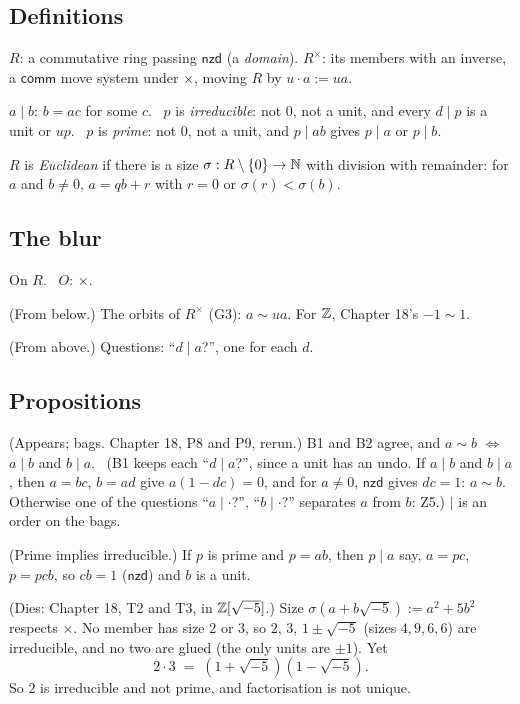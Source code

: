 \subsection*{Definitions}

\begin{lines}
\item[\lab{D1}] $R$: a commutative ring passing $\mathsf{nzd}$ (a \emph{domain}). $R^\times$: its members with an inverse, a $\mathsf{comm}$ move system under $\times$, moving $R$ by $u \cdot a := ua$.
\item[\lab{D2}] $a \mid b$: $b = ac$ for some $c$. \ $p$ is \emph{irreducible}: not $0$, not a unit, and every $d \mid p$ is a unit or $up$. \ $p$ is \emph{prime}: not $0$, not a unit, and $p \mid ab$ gives $p \mid a$ or $p \mid b$.
\item[\lab{D3}] $R$ is \emph{Euclidean} if there is a size $\sigma : R \setminus \{0\} \to \mathbb{N}$ with division with remainder: for $a$ and $b \ne 0$, $a = qb + r$ with $r = 0$ or $\sigma(r) < \sigma(b)$.
\end{lines}

\subsection*{The blur}

On $R$. \ $O$: $\times$.

\begin{lines}
\item[\lab{B1}] (From below.) The orbits of $R^\times$ (G3): $a \sim ua$. For $\mathbb{Z}$, Chapter 18's $-1 \sim 1$.
\item[\lab{B2}] (From above.) Questions: ``$d \mid a$?'', one for each $d$.
\end{lines}

\subsection*{Propositions}

\begin{lines}
\item[\lab{P1}] (Appears; bags. Chapter 18, P8 and P9, rerun.) B1 and B2 agree, and $a \sim b$ $\iff$ $a \mid b$ and $b \mid a$. \ (B1 keeps each ``$d \mid a$?'', since a unit has an undo. If $a \mid b$ and $b \mid a$, then $a = bc$, $b = ad$ give $a(1 - dc) = 0$, and for $a \ne 0$, $\mathsf{nzd}$ gives $dc = 1$: $a \sim b$. Otherwise one of the questions ``$a \mid {\cdot}$?'', ``$b \mid {\cdot}$?'' separates $a$ from $b$: Z5.) $\mid$ is an order on the bags.
\item[\lab{P2}] (Prime implies irreducible.) If $p$ is prime and $p = ab$, then $p \mid a$ say, $a = pc$, $p = pcb$, so $cb = 1$ ($\mathsf{nzd}$) and $b$ is a unit.
\item[\lab{P3}] (Dies: Chapter 18, T2 and T3, in $\mathbb{Z}[\sqrt{-5}]$.) Size $\sigma(a + b\sqrt{-5}) := a^2 + 5b^2$ respects $\times$. No member has size $2$ or $3$, so $2$, $3$, $1 \pm \sqrt{-5}$ (sizes $4, 9, 6, 6$) are irreducible, and no two are glued (the only units are $\pm 1$). Yet \[ 2 \cdot 3 \;=\; (1 + \sqrt{-5})(1 - \sqrt{-5}) . \] So $2$ is irreducible and not prime, and factorisation is not unique.
\end{lines}


